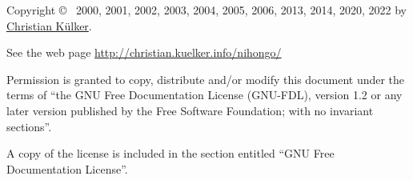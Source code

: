 \footnotesize

Copyright \copyright~ 2000, 2001, 2002, 2003, 2004, 2005, 2006, 2013, 2014,
2020, 2022 by
\href{mailto:christian.kuelker@cipworx.org}{Christian K\"ulker}.

\medskip

See the web page
\href{https://christian.kuelker.info/nihongo/}{http://christian.kuelker.info/nihongo/}


Permission is granted to copy, distribute and/or modify this document under the
terms of “the GNU Free Documentation License (GNU-FDL), version 1.2 or any
later version published by the Free Software Foundation; with no invariant
sections”.

A copy of the license is included in the section entitled “GNU Free
Documentation License”.

\normalsize
